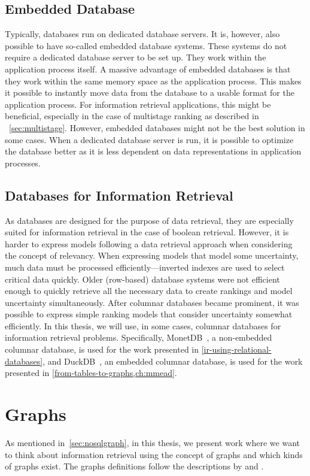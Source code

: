 \subsection{Embedded Database}
Typically, databases run on dedicated database servers. It is, however, also possible to have so-called embedded database systems. These systems do not require a dedicated database server to be set up. They work within the application process itself. A massive advantage of embedded databases is that they work within the same memory space as the application process. This makes it possible to instantly move data from the database to a usable format for the application process. For information retrieval applications, this might be beneficial, especially in the case of multistage ranking as described in ~\cref{sec:multistage}. However, embedded databases might not be the best solution in some cases. When a dedicated database server is run, it is possible to optimize the database better as it is less dependent on data representations in application processes. 

\subsection{Databases for Information Retrieval}
As databases are designed for the purpose of data retrieval, they are especially suited for information retrieval in the case of boolean retrieval. However, it is harder to express models following a data retrieval approach when considering the concept of relevancy. When expressing models that model some uncertainty, much data must be processed efficiently—inverted indexes are used to select critical data quickly. Older (row-based) database systems were not efficient enough to quickly retrieve all the necessary data to create rankings and model uncertainty simultaneously. After columnar databases became prominent, it was possible to express simple ranking models that consider uncertainty somewhat efficiently. In this thesis, we will use, in some cases, columnar databases for information retrieval problems. Specifically, MonetDB~\citep{monet}, a non-embedded columnar database, is used for the work presented in \cref{ir-using-relational-databases}, and DuckDB~\citep{duckdb}, an embedded columnar database, is used for the work presented in \cref{from-tables-to-graphs,ch:mmead}.

\section{Graphs}
\label{sec:graphs}
As mentioned in~\cref{sec:nosqlgraph}, in this thesis, we present work where we want to think about information retrieval using the concept of graphs and which kinds of graphs exist. The graphs definitions follow the descriptions by \citet{big-graphs} and \citet{angles2018property}.

